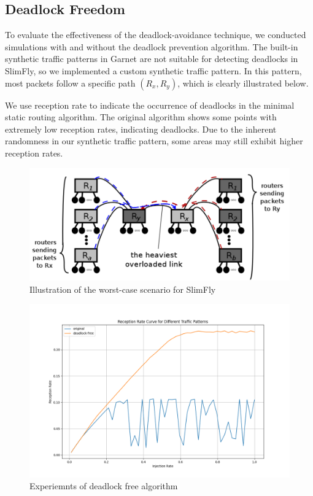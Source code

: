 \documentclass[utf8]{article}
\begin{document}
\subsection{Deadlock Freedom}

To evaluate the effectiveness of the deadlock-avoidance technique, we conducted simulations with and without the deadlock prevention algorithm. The built-in synthetic traffic patterns in Garnet are not suitable for detecting deadlocks in SlimFly, so we implemented a custom synthetic traffic pattern. In this pattern, most packets follow a specific path \((R_x, R_y)\), which is clearly illustrated below.

We use reception rate to indicate the occurrence of deadlocks in the minimal static routing algorithm. The original algorithm shows some points with extremely low reception rates, indicating deadlocks. Due to the inherent randomness in our synthetic traffic pattern, some areas may still exhibit higher reception rates.

\begin{figure}[H]
    \centering
    \includegraphics[width=0.6\linewidth]{WorstCase.png}
    \caption{Illustration of the worst-case scenario for SlimFly}
\end{figure}

\begin{figure}[H]
    \centering
    \includegraphics[width=0.85\linewidth]{deadlock.png}
    \caption{Experiemnts of deadlock free algorithm}
\end{figure}
\end{document}
